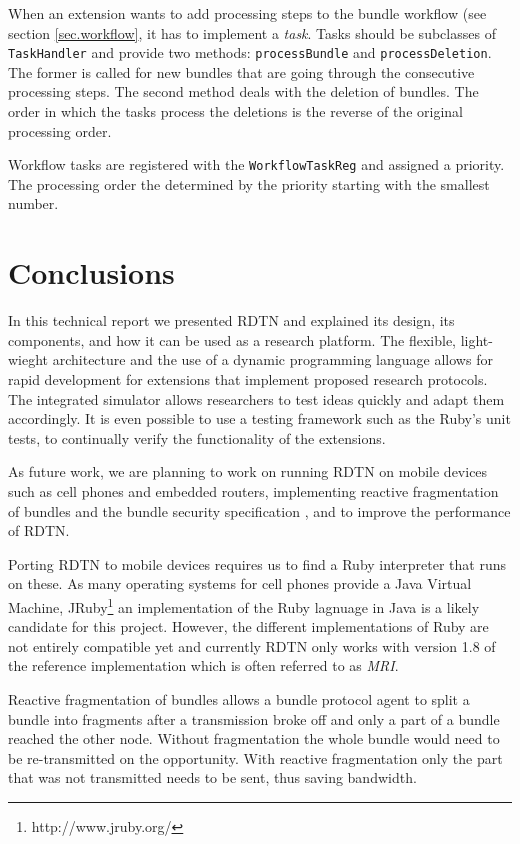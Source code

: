 \documentclass[a4paper]{article}
\begin{document}
When an extension wants to add processing steps to the bundle workflow (see
section \ref{sec.workflow}, it has to implement a {\em task}. Tasks should be
subclasses of {\tt TaskHandler} and provide two methods: {\tt processBundle} and
{\tt processDeletion}. The former is called for new bundles that are going
through the consecutive processing steps. The second method deals with the
deletion of bundles. The order in which the tasks process the deletions is
the reverse of the original processing order.

Workflow tasks are registered with the {\tt WorkflowTaskReg} and assigned a
priority. The processing order the determined by the priority starting with the
smallest number.

\section{Conclusions}\label{sec.conclusions}

In this technical report we presented RDTN and explained its design, its
components, and how it can be used as a research platform. The flexible,
light-wieght architecture and the use of a dynamic programming language allows
for rapid development for extensions that implement proposed research protocols.
The integrated simulator allows researchers to test ideas quickly and
adapt them accordingly. It is even possible to use a testing framework such as
the Ruby's unit tests, to continually verify the functionality of the
extensions.

As future work, we are planning to work on running RDTN on mobile devices such
as cell phones and embedded routers, implementing reactive fragmentation of
bundles and the bundle security specification \cite{bundle-security}, and to
improve the performance of RDTN.

Porting RDTN to mobile devices requires us to find a Ruby interpreter that runs
on these. As many operating systems for cell phones provide a Java Virtual
Machine, JRuby\footnote{http://www.jruby.org/} an implementation of the Ruby
lagnuage in Java is a likely candidate for this project. However, the different
implementations of Ruby are not entirely compatible yet and currently RDTN only
works with version 1.8 of the reference implementation which is often referred
to as {\em MRI}.

Reactive fragmentation of bundles allows a bundle protocol agent to split a
bundle into fragments after a transmission broke off and only a part of a bundle
reached the other node. Without fragmentation the whole bundle would need to be
re-transmitted on the opportunity. With reactive fragmentation only the 
part that was not transmitted needs to be sent, thus saving bandwidth.
\end{document}
